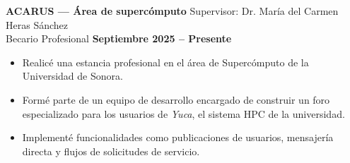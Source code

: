 \documentclass[11pt]{article}
\begin{document}
\vspace{0.2cm}
\textbf{ACARUS — Área de supercómputo} \hfill Supervisor: Dr. María del Carmen Heras Sánchez\\
Becario Profesional \hfill \textbf{Septiembre 2025 -- Presente}
\vspace{-0.3cm}
\begin{itemize}[leftmargin=*]
    \item Realicé una estancia profesional en el área de Supercómputo de la Universidad de Sonora.
    
    \vspace{-0.3cm}
    \item Formé parte de un equipo de desarrollo encargado de construir un foro especializado para los usuarios de \textit{Yuca}, el sistema HPC de la universidad.
    
    \vspace{-0.3cm}
    \item Implementé funcionalidades como publicaciones de usuarios, mensajería directa y flujos de solicitudes de servicio.
    
\end{itemize}


\end{document}
